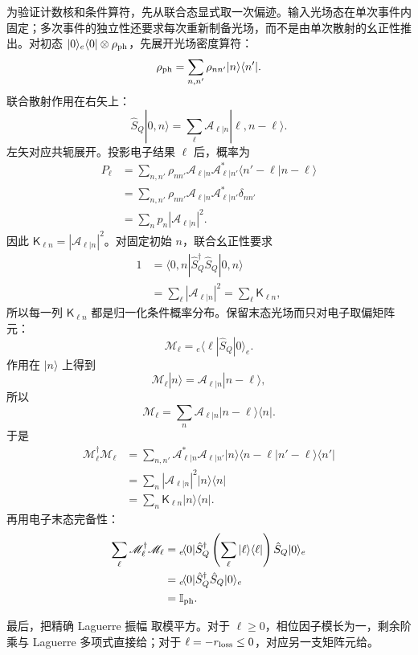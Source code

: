 \begin{exbox}
为验证计数核和条件算符，先从联合态显式取一次偏迹。输入光场态在单次事件内固定；多次事件的独立性还要求每次重新制备光场，而不是由单次散射的幺正性推出。对初态 $|0\rangle_e\langle0|\otimes\rho_{\rm ph}$，先展开光场密度算符：
\[
\rho_{\rm ph}=\sum_{n,n'}\rho_{nn'}|n\rangle\langle n'|.
\]
联合散射作用在右矢上：
\[
\hat S_Q|0,n\rangle
=\sum_\ell\mathcal A_{\ell|n}|\ell,n-\ell\rangle.
\]
左矢对应共轭展开。投影电子结果 $\ell$ 后，概率为
\begin{align*}
P_\ell
&=\sum_{n,n'}\rho_{nn'}
\mathcal A_{\ell|n}\mathcal A_{\ell|n'}^*
\langle n'-\ell|n-\ell\rangle\\
&=\sum_{n,n'}\rho_{nn'}
\mathcal A_{\ell|n}\mathcal A_{\ell|n'}^*\delta_{nn'}\\
&=\sum_n p_n|\mathcal A_{\ell|n}|^2.
\end{align*}
因此 $\mathsf K_{\ell n}=|\mathcal A_{\ell|n}|^2$。对固定初始 $n$，联合幺正性要求
\begin{align*}
1
&=\langle0,n|\hat S_Q^\dagger\hat S_Q|0,n\rangle\\
&=\sum_\ell|\mathcal A_{\ell|n}|^2
=\sum_\ell\mathsf K_{\ell n},
\end{align*}
所以每一列 $\mathsf K_{\ell n}$ 都是归一化条件概率分布。保留末态光场而只对电子取偏矩阵元：
\[
\mathscr M_\ell
={}_e\!\langle\ell|\hat S_Q|0\rangle_e.
\]
作用在 $|n\rangle$ 上得到
\[
\mathscr M_\ell|n\rangle
=\mathcal A_{\ell|n}|n-\ell\rangle,
\]
所以
\[
\mathscr M_\ell
=\sum_n\mathcal A_{\ell|n}|n-\ell\rangle\langle n|.
\]
于是
\begin{align*}
\mathscr M_\ell^\dagger\mathscr M_\ell
&=\sum_{n,n'}
\mathcal A_{\ell|n}^*\mathcal A_{\ell|n'}
|n\rangle\langle n-\ell|n'-\ell\rangle\langle n'|\\
&=\sum_n|\mathcal A_{\ell|n}|^2|n\rangle\langle n|\\
&=\sum_n\mathsf K_{\ell n}|n\rangle\langle n|.
\end{align*}
再用电子末态完备性：
\begin{align*}
\sum_\ell\mathscr M_\ell^\dagger\mathscr M_\ell
&={}_e\!\langle0|\hat S_Q^\dagger
\left(\sum_\ell|\ell\rangle\langle\ell|\right)
\hat S_Q|0\rangle_e\\
&={}_e\!\langle0|\hat S_Q^\dagger\hat S_Q|0\rangle_e\\
&=\mathbb I_{\rm ph}.
\end{align*}

最后，把精确 Laguerre 振幅 取模平方。对于 $\ell\ge0$，相位因子模长为一，剩余阶乘与 Laguerre 多项式直接给；对于 $\ell=-r_{\rm loss}\le0$，对应另一支矩阵元给。
\end{exbox}

